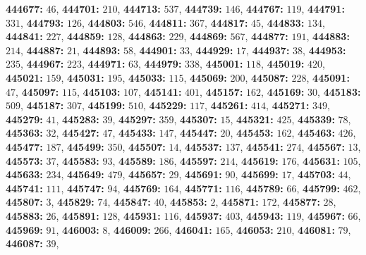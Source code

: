 \textsf{\bfseries 444677:} $46$, \textsf{\bfseries 444701:} $210$, \textsf{\bfseries 444713:} $537$, \textsf{\bfseries 444739:} $146$, \textsf{\bfseries 444767:} $119$, \textsf{\bfseries 444791:} $331$, \textsf{\bfseries 444793:} $126$, \textsf{\bfseries 444803:} $546$, \textsf{\bfseries 444811:} $367$, \textsf{\bfseries 444817:} $45$, \textsf{\bfseries 444833:} $134$, \textsf{\bfseries 444841:} $227$, \textsf{\bfseries 444859:} $128$, \textsf{\bfseries 444863:} $229$, \textsf{\bfseries 444869:} $567$, \textsf{\bfseries 444877:} $191$, \textsf{\bfseries 444883:} $214$, \textsf{\bfseries 444887:} $21$, \textsf{\bfseries 444893:} $58$, \textsf{\bfseries 444901:} $33$, \textsf{\bfseries 444929:} $17$, \textsf{\bfseries 444937:} $38$, \textsf{\bfseries 444953:} $235$, \textsf{\bfseries 444967:} $223$, \textsf{\bfseries 444971:} $63$, \textsf{\bfseries 444979:} $338$, \textsf{\bfseries 445001:} $118$, \textsf{\bfseries 445019:} $420$, \textsf{\bfseries 445021:} $159$, \textsf{\bfseries 445031:} $195$, \textsf{\bfseries 445033:} $115$, \textsf{\bfseries 445069:} $200$, \textsf{\bfseries 445087:} $228$, \textsf{\bfseries 445091:} $47$, \textsf{\bfseries 445097:} $115$, \textsf{\bfseries 445103:} $107$, \textsf{\bfseries 445141:} $401$, \textsf{\bfseries 445157:} $162$, \textsf{\bfseries 445169:} $30$, \textsf{\bfseries 445183:} $509$, \textsf{\bfseries 445187:} $307$, \textsf{\bfseries 445199:} $510$, \textsf{\bfseries 445229:} $117$, \textsf{\bfseries 445261:} $414$, \textsf{\bfseries 445271:} $349$, \textsf{\bfseries 445279:} $41$, \textsf{\bfseries 445283:} $39$, \textsf{\bfseries 445297:} $359$, \textsf{\bfseries 445307:} $15$, \textsf{\bfseries 445321:} $425$, \textsf{\bfseries 445339:} $78$, \textsf{\bfseries 445363:} $32$, \textsf{\bfseries 445427:} $47$, \textsf{\bfseries 445433:} $147$, \textsf{\bfseries 445447:} $20$, \textsf{\bfseries 445453:} $162$, \textsf{\bfseries 445463:} $426$, \textsf{\bfseries 445477:} $187$, \textsf{\bfseries 445499:} $350$, \textsf{\bfseries 445507:} $14$, \textsf{\bfseries 445537:} $137$, \textsf{\bfseries 445541:} $274$, \textsf{\bfseries 445567:} $13$, \textsf{\bfseries 445573:} $37$, \textsf{\bfseries 445583:} $93$, \textsf{\bfseries 445589:} $186$, \textsf{\bfseries 445597:} $214$, \textsf{\bfseries 445619:} $176$, \textsf{\bfseries 445631:} $105$, \textsf{\bfseries 445633:} $234$, \textsf{\bfseries 445649:} $479$, \textsf{\bfseries 445657:} $29$, \textsf{\bfseries 445691:} $90$, \textsf{\bfseries 445699:} $17$, \textsf{\bfseries 445703:} $44$, \textsf{\bfseries 445741:} $111$, \textsf{\bfseries 445747:} $94$, \textsf{\bfseries 445769:} $164$, \textsf{\bfseries 445771:} $116$, \textsf{\bfseries 445789:} $66$, \textsf{\bfseries 445799:} $462$, \textsf{\bfseries 445807:} $3$, \textsf{\bfseries 445829:} $74$, \textsf{\bfseries 445847:} $40$, \textsf{\bfseries 445853:} $2$, \textsf{\bfseries 445871:} $172$, \textsf{\bfseries 445877:} $28$, \textsf{\bfseries 445883:} $26$, \textsf{\bfseries 445891:} $128$, \textsf{\bfseries 445931:} $116$, \textsf{\bfseries 445937:} $403$, \textsf{\bfseries 445943:} $119$, \textsf{\bfseries 445967:} $66$, \textsf{\bfseries 445969:} $91$, \textsf{\bfseries 446003:} $8$, \textsf{\bfseries 446009:} $266$, \textsf{\bfseries 446041:} $165$, \textsf{\bfseries 446053:} $210$, \textsf{\bfseries 446081:} $79$, \textsf{\bfseries 446087:} $39$, 
